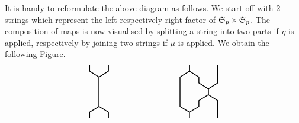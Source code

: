 It is handy to reformulate the above diagram as follows.
We start off with $2$ strings which represent the left respectively right factor of $\mathfrak S_p \times \mathfrak S_p$.
The composition of maps is now visualised by splitting a string into two parts if $\eta$ is applied, respectively by joining two strings if $\mu$ is applied.
We obtain the following Figure.
\[
    \begin{tikzpicture}[line width=1pt, yscale=.25, xscale=.8]
        \draw (1,9) -- (1,8) -- (.5,7) -- (.5,2) -- (1,1) -- (1,0);
        \draw (0,9) -- (0,8) -- (.5,7) -- (.5,2) -- (0,1) -- (0,0);
    \end{tikzpicture}
    \hspace{3cm}
    \begin{tikzpicture}[line width=1pt, yscale=.25, xscale=.8]
        \draw (0.5,9) -- (0.5,8) -- (0,7)                                         -- (0,2) -- (0.5,1) -- (0.5,0);
        \draw (0.5,9) -- (0.5,8) -- (1,7) -- (1,6) -- (1.5,5) -- (1.5,4) -- (1,3) -- (1,2) -- (0.5,1);
        \draw (2,9)   -- (2,6)                     -- (1.5,5) -- (1.5,4) -- (2,3)                     -- (2,0);
    \end{tikzpicture}
\]

